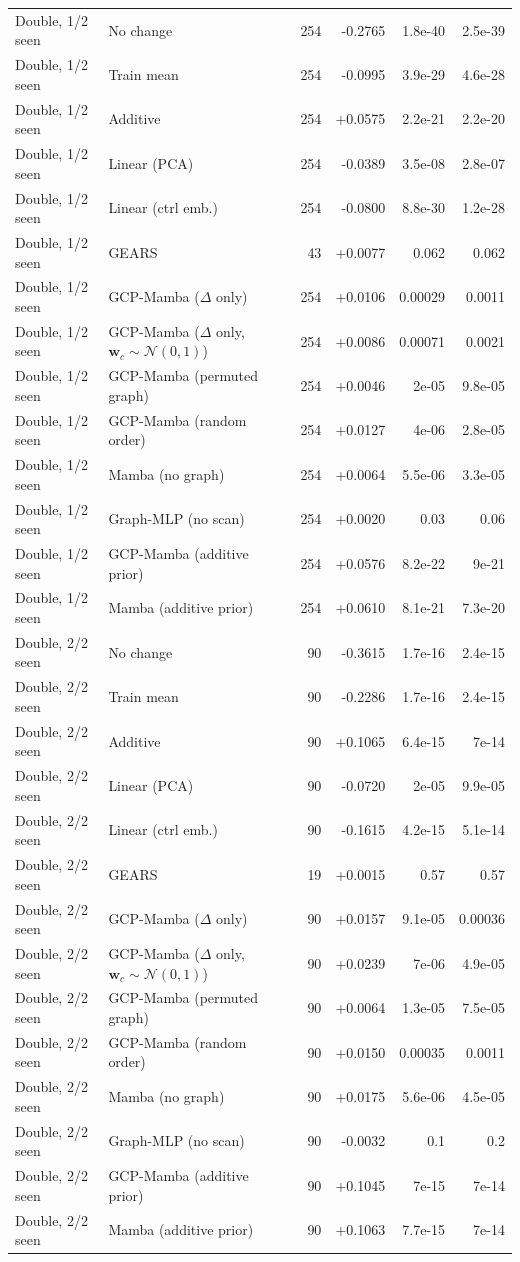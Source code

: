 \begin{longtable}{llrrrr}
Double, 1/2 seen & No change & 254 & -0.2765 & 1.8e-40 & 2.5e-39 \\
Double, 1/2 seen & Train mean & 254 & -0.0995 & 3.9e-29 & 4.6e-28 \\
Double, 1/2 seen & Additive & 254 & +0.0575 & 2.2e-21 & 2.2e-20 \\
Double, 1/2 seen & Linear (PCA) & 254 & -0.0389 & 3.5e-08 & 2.8e-07 \\
Double, 1/2 seen & Linear (ctrl emb.) & 254 & -0.0800 & 8.8e-30 & 1.2e-28 \\
Double, 1/2 seen & GEARS & 43 & +0.0077 & 0.062 & 0.062 \\
Double, 1/2 seen & GCP-Mamba ($\Delta$ only) & 254 & +0.0106 & 0.00029 & 0.0011 \\
Double, 1/2 seen & GCP-Mamba ($\Delta$ only, $\mathbf{w}_c\sim\mathcal{N}(0,1)$) & 254 & +0.0086 & 0.00071 & 0.0021 \\
Double, 1/2 seen & GCP-Mamba (permuted graph) & 254 & +0.0046 & 2e-05 & 9.8e-05 \\
Double, 1/2 seen & GCP-Mamba (random order) & 254 & +0.0127 & 4e-06 & 2.8e-05 \\
Double, 1/2 seen & Mamba (no graph) & 254 & +0.0064 & 5.5e-06 & 3.3e-05 \\
Double, 1/2 seen & Graph-MLP (no scan) & 254 & +0.0020 & 0.03 & 0.06 \\
Double, 1/2 seen & GCP-Mamba (additive prior) & 254 & +0.0576 & 8.2e-22 & 9e-21 \\
Double, 1/2 seen & Mamba (additive prior) & 254 & +0.0610 & 8.1e-21 & 7.3e-20 \\
\midrule
Double, 2/2 seen & No change & 90 & -0.3615 & 1.7e-16 & 2.4e-15 \\
Double, 2/2 seen & Train mean & 90 & -0.2286 & 1.7e-16 & 2.4e-15 \\
Double, 2/2 seen & Additive & 90 & +0.1065 & 6.4e-15 & 7e-14 \\
Double, 2/2 seen & Linear (PCA) & 90 & -0.0720 & 2e-05 & 9.9e-05 \\
Double, 2/2 seen & Linear (ctrl emb.) & 90 & -0.1615 & 4.2e-15 & 5.1e-14 \\
Double, 2/2 seen & GEARS & 19 & +0.0015 & 0.57 & 0.57 \\
Double, 2/2 seen & GCP-Mamba ($\Delta$ only) & 90 & +0.0157 & 9.1e-05 & 0.00036 \\
Double, 2/2 seen & GCP-Mamba ($\Delta$ only, $\mathbf{w}_c\sim\mathcal{N}(0,1)$) & 90 & +0.0239 & 7e-06 & 4.9e-05 \\
Double, 2/2 seen & GCP-Mamba (permuted graph) & 90 & +0.0064 & 1.3e-05 & 7.5e-05 \\
Double, 2/2 seen & GCP-Mamba (random order) & 90 & +0.0150 & 0.00035 & 0.0011 \\
Double, 2/2 seen & Mamba (no graph) & 90 & +0.0175 & 5.6e-06 & 4.5e-05 \\
Double, 2/2 seen & Graph-MLP (no scan) & 90 & -0.0032 & 0.1 & 0.2 \\
Double, 2/2 seen & GCP-Mamba (additive prior) & 90 & +0.1045 & 7e-15 & 7e-14 \\
Double, 2/2 seen & Mamba (additive prior) & 90 & +0.1063 & 7.7e-15 & 7e-14 \\
\bottomrule
\end{longtable}
